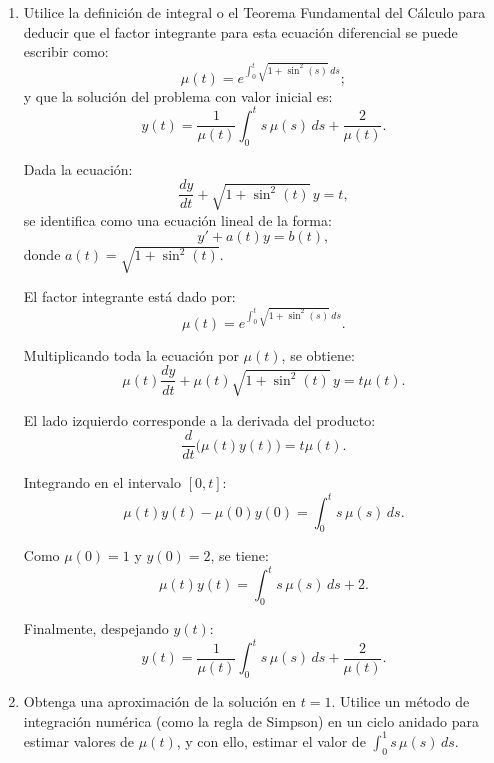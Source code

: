 \begin{enumerate}

    \item Utilice la definición de integral o el Teorema Fundamental del Cálculo para
    deducir que el factor integrante para esta ecuación diferencial se puede escribir
    como:
    \[
        \mu(t) = e^{\int_0^t \sqrt{1+\sin^2(s)}\,ds};
    \]
    y que la solución del problema con valor inicial es:
    \[
        y(t) = \frac{1}{\mu(t)}\int_0^t s\,\mu(s)\,ds + \frac{2}{\mu(t)}.
    \]

        \begin{respuesta}[title=Punto 1 — Factor Integrante]

        Dada la ecuación:
        \[
        \frac{dy}{dt} + \sqrt{1+\sin^2(t)}\,y = t,
        \]
        se identifica como una ecuación lineal de la forma:
        \[
        y' + a(t)y = b(t),
        \]
        donde \( a(t) = \sqrt{1+\sin^2(t)} \).

        El factor integrante está dado por:
        \[
        \mu(t) = e^{\int_0^t \sqrt{1+\sin^2(s)}\,ds}.
        \]

        Multiplicando toda la ecuación por \( \mu(t) \), se obtiene:
        \[
        \mu(t)\frac{dy}{dt} + \mu(t)\sqrt{1+\sin^2(t)}\,y = t\mu(t).
        \]

        El lado izquierdo corresponde a la derivada del producto:
        \[
        \frac{d}{dt}\bigl(\mu(t)y(t)\bigr) = t\mu(t).
        \]

        Integrando en el intervalo \( [0,t] \):
        \[
        \mu(t)y(t) - \mu(0)y(0) = \int_0^t s\,\mu(s)\,ds.
        \]

        Como \( \mu(0)=1 \) y \( y(0)=2 \), se tiene:
        \[
        \mu(t)y(t) = \int_0^t s\,\mu(s)\,ds + 2.
        \]

        Finalmente, despejando \( y(t) \):
        \[
        y(t) = \frac{1}{\mu(t)}\int_0^t s\,\mu(s)\,ds + \frac{2}{\mu(t)}.
        \]

        \end{respuesta}

    \item Obtenga una aproximación de la solución en $t=1$. Utilice un método de
    integración numérica (como la regla de Simpson) en un ciclo anidado para estimar
    valores de $\mu(t)$, y con ello, estimar el valor de $\displaystyle\int_0^1 s\,\mu(s)\,ds$.


\end{enumerate}
